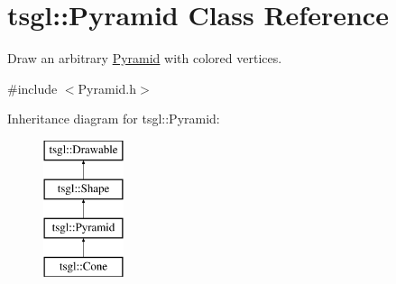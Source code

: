 \hypertarget{classtsgl_1_1_pyramid}{}\section{tsgl\+:\+:Pyramid Class Reference}
\label{classtsgl_1_1_pyramid}


Draw an arbitrary \hyperlink{classtsgl_1_1_pyramid}{Pyramid} with colored vertices.  




{\ttfamily \#include $<$Pyramid.\+h$>$}

Inheritance diagram for tsgl\+:\+:Pyramid\+:\begin{figure}[H]
\begin{center}
\leavevmode
\includegraphics[height=4.000000cm]{classtsgl_1_1_pyramid}
\end{center}
\end{figure}
